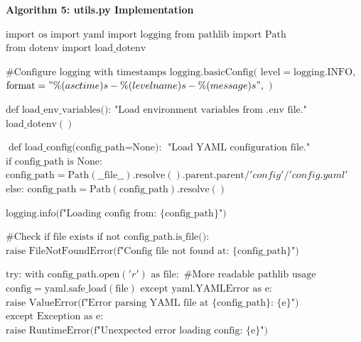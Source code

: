 \clearpage


\noindent\textbf{Algorithm 5: utils.py Implementation}

\begin{algorithmic}[1]
	\STATE $\text{import os}$
	\STATE $\text{import yaml}$
	\STATE $\text{import logging}$
	\STATE $\text{from pathlib import Path}$
	\STATE $\text{from dotenv import load\_dotenv}$
	
	\STATE
	\STATE $\text{\# Configure logging with timestamps}$
	\STATE $\text{logging.basicConfig}($
	\STATE \hspace{0.5cm} $\text{level} = \text{logging.INFO},$
	\STATE \hspace{0.5cm} $\text{format} = "\%(asctime)s - \%(levelname)s - \%(message)s",$
	\STATE $)$
	
	\STATE
	\STATE $\text{def load\_env\_variables():}$
	\STATE \hspace{0.5cm} $\text{"Load environment variables from .env file."}$
	\STATE \hspace{0.5cm} $\text{load\_dotenv}()$
	
	\STATE
	\STATE $\text{def load\_config(config\_path} = \text{None):}$
	\STATE \hspace{0.5cm} $\text{"Load YAML configuration file."}$
	\STATE \hspace{0.5cm} $\text{if config\_path is None:}$
	\STATE \hspace{1.0cm} $\text{config\_path} = \text{Path}(\text{\_\_file\_\_}).\text{resolve}().\text{parent}.\text{parent} / 'config' / 'config.yaml'$
	\STATE \hspace{0.5cm} $\text{else:}$
	\STATE \hspace{1.0cm} $\text{config\_path} = \text{Path}(\text{config\_path}).\text{resolve}()$
	
	\STATE \hspace{0.5cm} $\text{logging.info(f"Loading config from: \{config\_path\}")}$
	
	\STATE \hspace{0.5cm} $\text{\# Check if file exists}$
	\STATE \hspace{0.5cm} $\text{if not config\_path.is\_file():}$
	\STATE \hspace{1.0cm} $\text{raise FileNotFoundError(f"Config file not found at: \{config\_path\}")}$
	
	\STATE \hspace{0.5cm} $\text{try:}$
	\STATE \hspace{1.0cm} $\text{with config\_path.open}('r') \text{ as file}:$
	\STATE \hspace{1.5cm} $\text{\# More readable pathlib usage}$
	\STATE \hspace{1.5cm} $\text{config} = \text{yaml.safe\_load}(\text{file})$
	\STATE \hspace{0.5cm} $\text{except yaml.YAMLError as e:}$
	\STATE \hspace{1.0cm} $\text{raise ValueError(f"Error parsing YAML file at \{config\_path\}: \{e\}")}$
	\STATE \hspace{0.5cm} $\text{except Exception as e:}$
	\STATE \hspace{1.0cm} $\text{raise RuntimeError(f"Unexpected error loading config: \{e\}")}$
	

\end{algorithmic}
